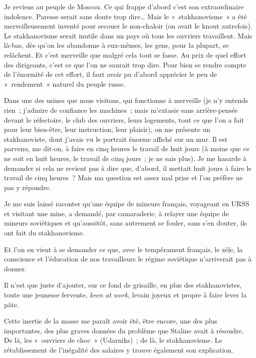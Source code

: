 \documentclass[french,twoside]{book} %
\begin{document}
\noindent Je reviens au peuple de Moscou. Ce qui frappe d’abord c’est son extraordinaire indolence. Paresse serait sans doute trop dire… Mais le « stakhanovisme » a été merveilleusement inventé pour secouer le non-chaloir (on avait le knout autrefois). Le stakhanovisme serait inutile dans un pays où tous les ouvriers travaillent. Mais là-bas, dès qu’on les abandonne à eux-mêmes, les gens, pour la plupart, se relâchent. Et c’est merveille que malgré cela tout se fasse. Au prix de quel effort des dirigeants, c’est ce que l’on ne saurait trop dire. Pour bien se rendre compte de l’énormité de cet effort, il faut avoir pu d’abord apprécier le peu de « rendement » naturel du peuple russe.\par
Dans une des usines que nous visitons, qui fonctionne à merveille (je n’y entends rien ; j’admire de confiance les machines ; mais m’extasie sans arrière-pensée devant le réfectoire, le club des ouvriers, leurs logements, tout ce que l’on a fait pour leur bien-être, leur instruction, leur plaisir), on me présente un stakhanoviste, dont j’avais vu le portrait énorme affiché sur un mur. Il est parvenu, me dit-on, à faire en cinq heures le travail de huit jours (à moins que ce ne soit en huit heures, le travail de cinq jours ; je ne sais plus). Je me hasarde à demander si cela ne revient pas à dire que, d’abord, il mettait huit jours à faire le travail de cinq heures ? Mais ma question est assez mal prise et l’on préfère ne pas y répondre.\par
Je me suis laissé raconter qu’une équipe de mineurs français, voyageant en URSS et visitant une mine, a demandé, par camaraderie, à relayer une équipe de mineurs soviétiques et qu’aussitôt, sans autrement se fouler, sans s’en douter, ils ont fait du stakhanovisme.\par
Et l’on en vient à se demander ce que, avec le tempérament français, le zèle, la conscience et l’éducation de nos travailleurs le régime soviétique n’arriverait pas à donner.\par
Il n’est que juste d’ajouter, sur ce fond de grisaille, en plus des stakhanovistes, toute une jeunesse fervente, \emph{keen at work}, levain joyeux et propre à faire lever la pâte.\par
Cette inertie de la masse me paraît avoir été, être encore, une des plus importantes, des plus graves données du problème que Staline avait à résoudre. De là, les « ouvriers de choc » (Udarniks) ; de là, le stakhanovisme. Le rétablissement de l’inégalité des salaires y trouve également son explication.\par
\end{document}
